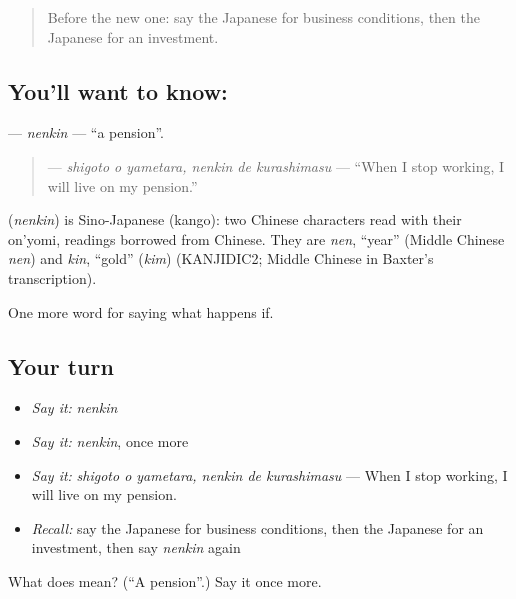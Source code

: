 \begin{quote}
Before the new one: say the Japanese for business conditions, then the Japanese for an investment.
\end{quote}

\subsection*{You'll want to know: }
\textbf{} — \emph{nenkin} — \textquotedblleft{}a pension\textquotedblright{}.

\begin{quote}
\textbf{  } — \emph{shigoto o yametara, nenkin de kurashimasu} — \textquotedblleft{}When I stop working, I will live on my pension.\textquotedblright{}
\end{quote}

\begin{cousinweb}
\textbf{} (\emph{nenkin}) is Sino-Japanese (kango): two Chinese characters read with their on'yomi, readings borrowed from Chinese. They are \emph{nen}, \textquotedblleft{}year\textquotedblright{} (Middle Chinese \emph{nen}) and \emph{kin}, \textquotedblleft{}gold\textquotedblright{} (\emph{kim}) (KANJIDIC2; Middle Chinese in Baxter's transcription).
\end{cousinweb}

\begin{grammarlens}[title={What you've built}]
One more word for saying what happens if.
\end{grammarlens}

\subsection*{Your turn}
\begin{itemize}
\raggedright
  \item \emph{Say it:} \emph{nenkin}
  \item \emph{Say it:} \emph{nenkin}, once more
  \item \emph{Say it:} \emph{shigoto o yametara, nenkin de kurashimasu} — When I stop working, I will live on my pension.
  \item \emph{Recall:} say the Japanese for business conditions, then the Japanese for an investment, then say \emph{nenkin} again
\end{itemize}

\begin{tcolorbox}[breakable,colback=teal!4,colframe=teal!35!black,title={Before you move on}]
What does  mean? (\textquotedblleft{}A pension\textquotedblright{}.) Say it once more.
\end{tcolorbox}
